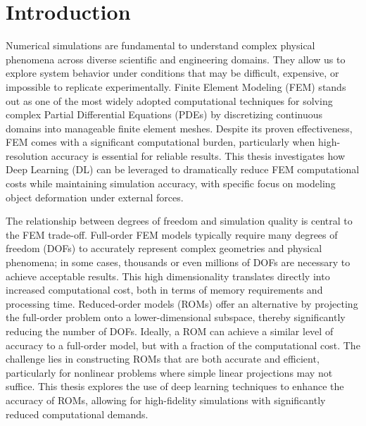 

\section{Introduction}
Numerical simulations are fundamental to understand complex physical phenomena across diverse scientific and engineering domains. They allow us to explore system behavior under conditions that may be difficult, expensive, or impossible to replicate experimentally. Finite Element Modeling (FEM) stands out as one of the most widely adopted computational techniques for solving complex Partial Differential Equations (PDEs) by discretizing continuous domains into manageable finite element meshes. Despite its proven effectiveness, FEM comes with a significant computational burden, particularly when high-resolution accuracy is essential for reliable results. This thesis investigates how Deep Learning (DL) can be leveraged to dramatically reduce FEM computational costs while maintaining simulation accuracy, with specific focus on modeling object deformation under external forces.


The relationship between degrees of freedom and simulation quality is central to the FEM trade-off. Full-order FEM models typically require many degrees of freedom (DOFs) to accurately represent complex geometries and physical phenomena; in some cases, thousands or even millions of DOFs are necessary to achieve acceptable results. This high dimensionality translates directly into increased computational cost, both in terms of memory requirements and processing time. Reduced-order models (ROMs) offer an alternative by projecting the full-order problem onto a lower-dimensional subspace, thereby significantly reducing the number of DOFs. Ideally, a ROM can achieve a similar level of accuracy to a full-order model, but with a fraction of the computational cost. The challenge lies in constructing ROMs that are both accurate and efficient, particularly for nonlinear problems where simple linear projections may not suffice. This thesis explores the use of deep learning techniques to enhance the accuracy of ROMs, allowing for high-fidelity simulations with significantly reduced computational demands.

